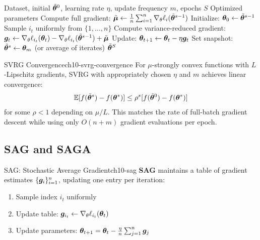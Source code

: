 \documentclass[../../main.tex]{subfiles}
\begin{document}
\begin{algorithm}[htbp]
\caption{SVRG: Stochastic Variance Reduced Gradient}
\label{alg:ch10-svrg}
\begin{algorithmic}[1]
\Require Dataset, initial $\tilde{\boldsymbol{\theta}}^0$, learning rate $\eta$, update frequency $m$, epochs $S$
\Ensure Optimized parameters
    \State Compute full gradient: $\tilde{\boldsymbol{\mu}} \gets \frac{1}{n}\sum_{i=1}^n \nabla_\theta \ell_i(\tilde{\boldsymbol{\theta}}^{s-1})$
    \State Initialize: $\boldsymbol{\theta}_0 \gets \tilde{\boldsymbol{\theta}}^{s-1}$
        \State Sample $i_t$ uniformly from $\{1, \ldots, n\}$
        \State Compute variance-reduced gradient:
        \State \quad $\boldsymbol{g}_t \gets \nabla_\theta \ell_{i_t}(\boldsymbol{\theta}_t) - \nabla_\theta \ell_{i_t}(\tilde{\boldsymbol{\theta}}^{s-1}) + \tilde{\boldsymbol{\mu}}$
        \State Update: $\boldsymbol{\theta}_{t+1} \gets \boldsymbol{\theta}_t - \eta \boldsymbol{g}_t$
    \EndFor
    \State Set snapshot: $\tilde{\boldsymbol{\theta}}^s \gets \boldsymbol{\theta}_m$ (or average of iterates)
\EndFor
\State \Return $\tilde{\boldsymbol{\theta}}^S$
\end{algorithmic}
\end{algorithm}

\begin{theorem}{SVRG Convergence}{ch10-svrg-convergence}
For $\mu$-strongly convex functions with $L$-Lipschitz gradients, SVRG with appropriately chosen $\eta$ and $m$ achieves linear convergence:
\[
    \operatorname{\mathbb{E}}[f(\tilde{\boldsymbol{\theta}}^s) - f(\boldsymbol{\theta}^*)] \leq \rho^s [f(\tilde{\boldsymbol{\theta}}^0) - f(\boldsymbol{\theta}^*)]
\]
for some $\rho < 1$ depending on $\mu/L$. This matches the rate of full-batch gradient descent while using only $O(n + m)$ gradient evaluations per epoch.
\end{theorem}

\subsection{SAG and SAGA}

\begin{definition}{SAG: Stochastic Average Gradient}{ch10-sag}
\textbf{SAG} maintains a table of gradient estimates $\{\boldsymbol{g}_i\}_{i=1}^n$, updating one entry per iteration:
\begin{enumerate}
    \item Sample index $i_t$ uniformly
    \item Update table: $\boldsymbol{g}_{i_t} \gets \nabla_\theta \ell_{i_t}(\boldsymbol{\theta}_t)$
    \item Update parameters: $\boldsymbol{\theta}_{t+1} = \boldsymbol{\theta}_t - \frac{\eta}{n}\sum_{j=1}^n \boldsymbol{g}_j$
\end{enumerate}
\end{definition}
\end{document}
